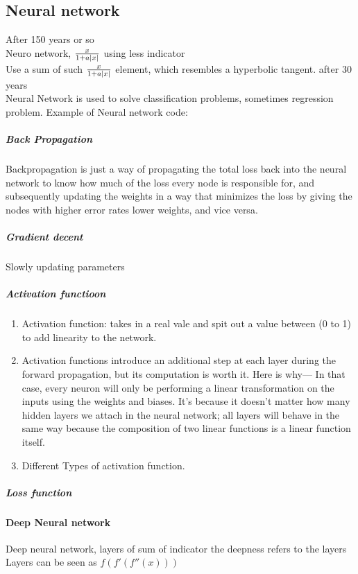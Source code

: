 \documentclass[12pt,a4paper]{article}
\begin{document}
\subsection{Neural network}
After 150 years or so \\
Neuro network, $\frac{x}{1+a\abs{x}}$ using less indicator\\
Use a sum of such $\frac{x}{1+a\abs{x}}$ element, which resembles a hyperbolic tangent.
after 30 years\\
Neural Network is used to solve classification problems, sometimes regression problem.
Example of Neural network code:
\subparagraph*{Back Propagation}
Backpropagation is just a way of propagating the total loss back into the neural network to know how much of the loss every node is responsible for, and subsequently updating the weights in a way that minimizes the loss by giving the nodes with higher error rates lower weights, and vice versa.
\subparagraph*{Gradient decent}
    Slowly updating parameters 
\subparagraph*{Activation functioon}
\begin{enumerate}
    \item Activation function: takes in a real vale and spit out a value between (0 to 1) to add linearity to the network.
    \item Activation functions introduce an additional step at each layer during the forward propagation, but its computation is worth it. Here is why—
    In that case, every neuron will only be performing a linear transformation on the inputs using the weights and biases. It’s because it doesn’t matter how many hidden layers we attach in the neural network; all layers will behave in the same way because the composition of two linear functions is a linear function itself.
    \item Different Types of activation function.

\end{enumerate}
\subparagraph*{Loss function}
\paragraph{Deep Neural network}
Deep neural network, layers of sum of indicator
the deepness refers to the layers\\
Layers can be seen as $f(f'(f''(x)))$\\
\end{document}
